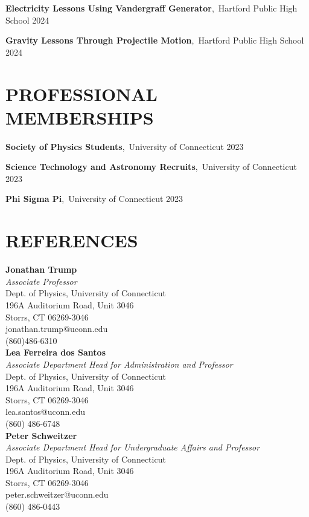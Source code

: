 \documentclass[a4paper,9pt]{extarticle}
\begin{document}
\noindent
\textbf{Electricity Lessons Using Vandergraff Generator},\ Hartford Public High School \hfill 2024

\noindent
\textbf{Gravity Lessons Through Projectile Motion},\ Hartford Public High School \hfill 2024


\section*{PROFESSIONAL MEMBERSHIPS}

\noindent
\newline
\textbf{Society of Physics Students},\ University of Connecticut \hfill 2023

\noindent
\textbf{Science Technology and Astronomy Recruits},\ University of Connecticut \hfill 2023

\noindent
\textbf{Phi Sigma Pi},\ University of Connecticut \hfill 2023


\section*{REFERENCES}

\noindent
\newline
\textbf{Jonathan Trump} \\
\textit{Associate Professor} \\
Dept. of Physics, University of Connecticut \\
196A Auditorium Road, Unit 3046 \\
Storrs, CT 06269-3046\\
jonathan.trump@uconn.edu \\
(860)486-6310 \\

\noindent
\textbf{Lea Ferreira dos Santos} \\
\textit{Associate Department Head for Administration and Professor} \\
Dept. of Physics, University of Connecticut \\
196A Auditorium Road, Unit 3046 \\
Storrs, CT 06269-3046\\
lea.santos@uconn.edu \\
(860) 486-6748 \\

\noindent
\textbf{Peter Schweitzer} \\
\textit{Associate Department Head for Undergraduate Affairs and Professor} \\
Dept. of Physics, University of Connecticut \\
196A Auditorium Road, Unit 3046 \\
Storrs, CT 06269-3046\\
peter.schweitzer@uconn.edu \\
(860) 486-0443 \\


\end{document}
